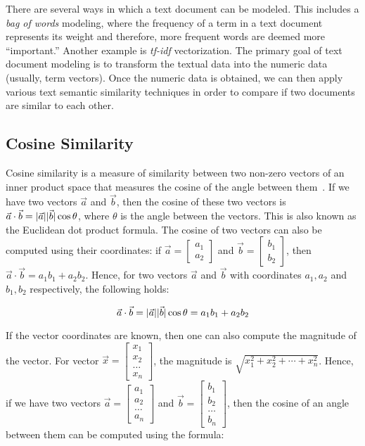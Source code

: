 \documentclass[11pt]{article}
\DeclarePairedDelimiter\abs{\lvert}{\rvert}               %
\begin{document}
There are several ways in which a text document can be modeled. This includes a
\textit{bag of words} modeling, where the frequency of a term in a text
document represents its weight and therefore, more frequent words are deemed
more ``important.'' Another example is \textit{tf-idf} vectorization. The
primary goal of text document modeling is to transform the textual data into
the numeric data (usually, term vectors). Once the numeric data is obtained, we
can then apply various text semantic similarity techniques in order to compare
if two documents are similar to each other.

\subsection{Cosine Similarity}

Cosine similarity is a measure of similarity between two non-zero vectors of an
inner product space that measures the cosine of the angle between
them~\cite{wikicosine}. If we have two vectors \(\vec{a}\) and \(\vec{b}\),
then the cosine of these two vectors is
\(\vec{a} \cdot \vec{b} = \abs{\vec{a}}\abs{\vec{b}}\cos\theta\),
where \(\theta\) is the angle between the vectors. This is also known as the
Euclidean dot product formula.
The cosine of two vectors can also be computed using their coordinates:
if \(\vec{a} = \begin{bmatrix}a_1 \\ a_2\end{bmatrix}\) and
\(\vec{b} = \begin{bmatrix}b_1 \\ b_2\end{bmatrix}\), then
\(\vec{a} \cdot \vec{b} = a_1b_1 + a_2b_2\). Hence, for two vectors \(\vec{a}\)
and \(\vec{b}\) with coordinates \(a_1, a_2\) and \(b_1, b_2\) respectively,
the following holds:

\[\vec{a} \cdot \vec{b} = \abs{\vec{a}}\abs{\vec{b}}\cos\theta = a_1b_1 + a_2b_2\]

\bigskip

If the vector coordinates are known, then one can also compute the magnitude of
the vector. For vector
\(\vec{x} = \begin{bmatrix}x_1 \\ x_2 \\ \dots \\ x_n\end{bmatrix}\),
the magnitude is \(\sqrt{x_1^2 + x_2^2 + \cdots + x_n^2}\). Hence, if we have two
vectors \(\vec{a} = \begin{bmatrix}a_1 \\ a_2 \\ \dots \\ a_n\end{bmatrix}\) and
\(\vec{b} = \begin{bmatrix}b_1 \\ b_2 \\ \dots \\ b_n\end{bmatrix}\), then the cosine
of an angle between them can be computed using the formula:
\end{document}
